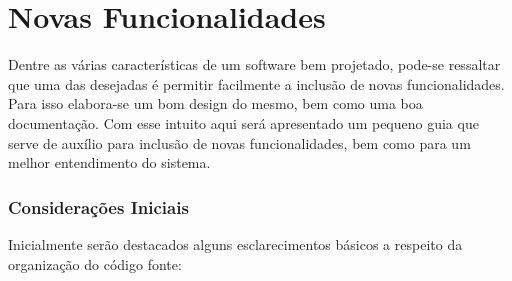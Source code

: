 \chapter{Novas Funcionalidades}

Dentre as várias características de um software bem projetado, pode-se ressaltar que uma das desejadas é permitir facilmente a inclusão de novas funcionalidades. Para isso elabora-se um bom design do mesmo, bem como uma boa documentação. Com esse intuito aqui será apresentado um pequeno guia que serve de auxílio para inclusão de novas funcionalidades, bem como para um melhor entendimento do sistema.

\subsection{Considerações Iniciais}

Inicialmente serão destacados alguns esclarecimentos básicos a respeito da organização do código fonte:

